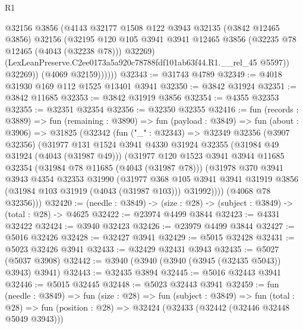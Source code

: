 \begin{lexlean}{R1}
\begin{coremodule}
                  @32156
                  @3856
                  (@4143
                    @32177
                    @1508
                    @122
                    @3943
                    @32135
                    (@3842 @12465 @3856)
                    @32156
                    (@32195
                      @120
                      @105
                      @3941
                      @3941
                      @12465
                      @3856
                      (@32235 @78 @12465 (@4043 (@32238 @78)))
                      @32269)
                    (LexLeanPreserve.C2ee0173a5a920c78788fdf101ab63f44.R1.__rel_45 @5597))
                  @32269))
              (@4069 @32159))))))
@32343 := @31743 @4789
@32349 := @4018 @31930 @169 @112 @1525 @13401 @3941
@32350 := @3842 @31924
@32351 := @3842 @11685
@32353 := @3842 @31919 @3856
@32354 := @4355 @32353
@32355 := @32351 @32354
@32356 := @32350 @32355
@32416 := fun (records : @3889) =>
  fun (remaining : @3890) =>
  fun (payload : @3849) =>
  fun (about : @3906) =>
  @31825
    (@32342
      (fun ("_" : @32343) =>
      @32349
        @32356
        (@3907 @32356)
        (@31977
          @131
          @1524
          @3941
          @4330
          @31924
          @32355
          (@31984 @49 @31924 (@4043 (@31987 @49)))
          (@31977
            @120
            @1523
            @3941
            @3944
            @11685
            @32354
            (@31984 @78 @11685 (@4043 (@31987 @78)))
            (@31978
              @370
              @3941
              @3943
              @4354
              @32353
              @31990
              (@31977
                @368
                @105
                @3941
                @3941
                @31919
                @3856
                (@31984 @103 @31919 (@4043 (@31987 @103)))
                @31992))))
        (@4068 @78 @32356)))
@32420 := (needle : @3849) -> (size : @28) -> (subject : @3849) -> (total : @28) -> @4625
@32422 := @23974 @4499 @3844
@32423 := @4331 @32422
@32424 := @3940 @32423
@32426 := @23979 @4499 @3844
@32427 := @5016 @32426
@32428 := @32427 @3941
@32429 := @5015 @32428
@32431 := @5023 @32426 @3941
@32433 := @32429 @32431 @3943
@32435 := @5027 (@5037 @3908)
@32442 := @3940 (@3940 (@3940 (@3945 (@32435 @5043)) @3943) @3941)
@32443 := @32435 @3894
@32445 := @5016 @32443 @3941
@32446 := @5015 @32445
@32448 := @5023 @32443 @3941
@32459 := fun (needle : @3849) =>
  fun (size : @28) =>
  fun (subject : @3849) =>
  fun (total : @28) => fun (position : @28) => @32424 (@32433 (@32442 (@32446 @32448 @5049 @3943)))

\end{coremodule}
\end{lexlean}
